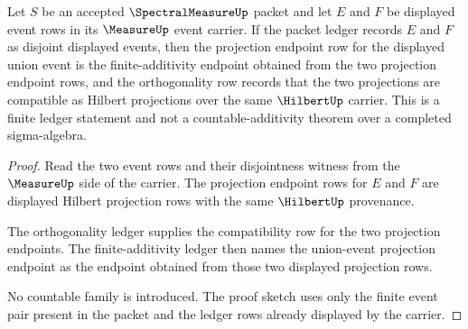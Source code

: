 \begin{theorem}
\label{thm:spectralmeasure-orthogonal-additivity}
Let $S$ be an accepted $\SpectralMeasureUp$ packet and let $E$ and $F$ be displayed event rows in its $\MeasureUp$ event carrier. If the packet ledger records $E$ and $F$ as disjoint displayed events, then the projection endpoint row for the displayed union event is the finite-additivity endpoint obtained from the two projection endpoint rows, and the orthogonality row records that the two projections are compatible as Hilbert projections over the same $\HilbertUp$ carrier. This is a finite ledger statement and not a countable-additivity theorem over a completed sigma-algebra.
\end{theorem}
\begin{proof}
Read the two event rows and their disjointness witness from the $\MeasureUp$ side of the carrier. The projection endpoint rows for $E$ and $F$ are displayed Hilbert projection rows with the same $\HilbertUp$ provenance.

The orthogonality ledger supplies the compatibility row for the two projection endpoints. The finite-additivity ledger then names the union-event projection endpoint as the endpoint obtained from those two displayed projection rows.

No countable family is introduced. The proof sketch uses only the finite event pair present in the packet and the ledger rows already displayed by the carrier.
\end{proof}

